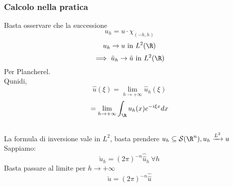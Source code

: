 \subsubsection{Calcolo nella pratica}
Basta osservare che la successione
\[u_h=u\cdot \chi_{(-h,h)}\]
\[u_h\xrightarrow {}u\text{ in }L^{2}(\R)\]
\[\implies \hat{u}_h\to \hat{u}\text{ in }L^{2}(\R)\]
Per Plancherel.\\
Qunidi,
\[\hat{u}(\xi)=\lim_{h \to +\infty} \hat{u}_h(\xi)\]
\[=\lim_{h \to +\infty} \int_{\R}^{} u_h(x)e^{-i\xi x}dx\]
\\La formula di inversione vale in $L^{2}$, basta prendere $u_h \subseteq  \mathcal S(\R^n),u_h\xrightarrow{L^2}u$ \\
Sappiamo:
\[\check u_h=(2\pi)^{-n}\hat{\hat{u}}_h\ \forall h\]
Basta passare al limite per $h\to +\infty$ 
\[\check u=(2\pi)^{-n}\hat{\hat{u}}\]


